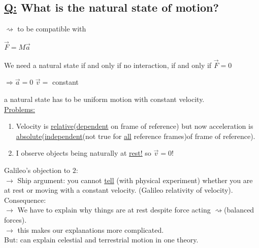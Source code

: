 \documentclass[a4paper, 12pt]{article}
\begin{document}
\subsection{\underline{Q:} What is the natural state of motion?}
$\rightsquigarrow$ to be compatible with
\begin{center}
$\vec{F} = M \vec{a}$
\end{center}
We need a natural state if and only if no interaction, if and only if $\vec{F} = 0$
\begin{center}
$\Rightarrow \vec{a} = 0$    $\vec{v} = $ constant
\end{center}
a natural state has to be uniform motion with constant velocity.\\
\underline{Problems:}
\begin{enumerate}
\item Velocity is \underline{relative}(\underline{dependent} on frame of reference) but now acceleration is \underline{absolute}(\underline{independent}(not true for \underline{all} reference frames)of frame of reference).
\item I observe objects being naturally at \underline{rest!} so $\vec{v} = 0$!
\end{enumerate}
Galileo's objection to $2$:\\
$\rightarrow$ Ship argument: you cannot  \underline{tell} (with physical experiment) whether you are at rest or moving with a constant velocity. (Galileo relativity of velocity).\\
Consequence:\\
$\rightarrow$ We have to explain why things are at rest despite force acting $\rightsquigarrow$(balanced forces).\\
$\rightarrow$ this makes our explanations more complicated.\\
But: can explain celestial and terrestrial motion in one theory.\\
\end{document}
